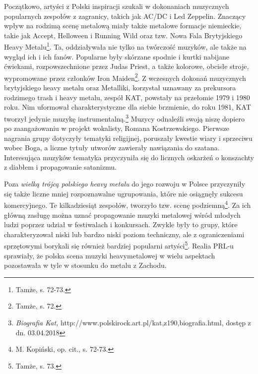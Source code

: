 \documentclass[12pt, a4paper, titlepage]{report}
\begin{document}
Początkowo, artyści z Polski inspiracji szukali w dokonaniach muzycznych popularnych zespołów z zagranicy, takich jak AC/DC i Led Zeppelin. Znaczący wpływ na rodzimą scenę metalową miały także metalowe formacje niemieckie, takie jak Accept, Helloween i Running Wild oraz tzw. Nowa Fala Brytyjskiego Heavy Metalu\footnote{Tamże, s. 72-73.}. Ta, oddziaływała nie tylko na twórczość muzyków, ale także na wygląd ich i ich fanów. Popularne były skórzane spodnie i kurtki nabijane ćwiekami, rozpowszechnione przez Judas Priest, a także kolorowe, obcisłe stroje, wypromowane przez członków Iron Maiden\footnote{Tamże, s. 72.}. Z wczesnych dokonań muzycznych brytyjskiego heavy metalu oraz Metalliki, korzystał uznawany za prekursora rodzimego trash i heavy metalu, zespół KAT, powstały na przełomie 1979 i 1980 roku. Nim uformował charakterystyczne dla siebie brzmienie, do roku 1981, KAT tworzył jedynie muzykę instrumentalną.\footnote{\textit{Biografia Kat,} http://www.polskirock.art.pl/kat,z190,biografia.html, dostęp z dn. 03.04.2018} Muzycy odnaleźli swoją niszę dopiero po zaangażowaniu w projekt wokalisty, Romana Kostrzewskiego. Pierwsze nagrania grupy dotyczyły tematyki religijnej, poruszały kwestie wiary i sprzeciwu wobec Boga, a liczne tytuły utworów zawierały nawiązania do szatana. Interesująca muzyków tematyka przyczyniła się do licznych oskarżeń o konszachty z diabłem i propagowanie satanizmu. 

Poza \emph{wielką trójcą polskiego heavy metalu} do jego rozwoju w Polsce przyczyniły się także liczne mniej rozpoznawalne ugrupowania, które nie osiągnęły sukcesu komercyjnego. Te kilkadziesiąt zespołów, tworzyło tzw. scenę podziemną\footnote{M. Kopiński, op. cit., s. 72-73.}. Za ich główną zasługę można uznać propagowanie muzyki metalowej wśród młodych ludzi poprzez udział w festiwalach i konkursach. Zwykle były to grupy, które charakteryzował niski lub bardzo niski poziom techniczny, ale z ograniczeniami sprzętowymi borykali się również bardziej popularni artyści\footnote{Tamże, s. 73.}. Realia PRL-u sprawiały, że polska scena muzyki heavymetalowej w wielu aspektach pozostawała w tyle w stosunku do metalu z Zachodu.
\end{document}
